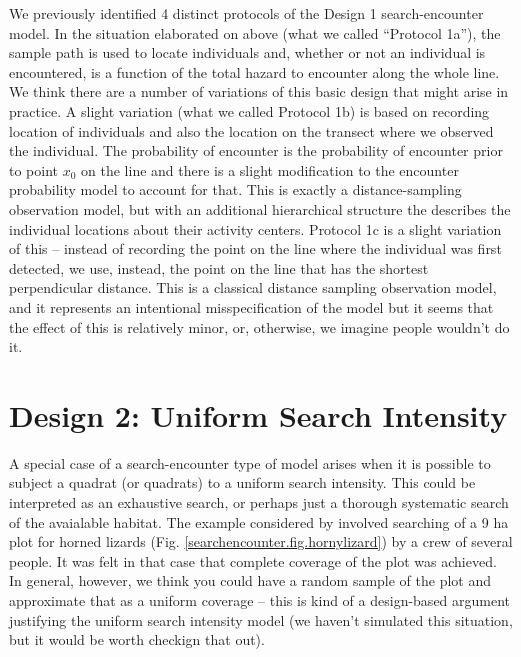 We previously identified 4 distinct protocols of the Design 1
search-encounter model.
In the situation elaborated on above (what we called ``Protocol 1a''), the sample path is used to
locate individuals and, whether or not an individual is encountered,
is a function of the total hazard to encounter along the whole line.
We think there are a number of variations of this basic design that
might arise in practice.
A slight variation (what we called Protocol 1b) is based on 
recording location of individuals and also the location on the transect
where we observed the individual.  The probability of encounter is the
probability of encounter prior to point $x_{0}$ on the line
\citep{skaug_schweder:1999} and there is a slight modification to the
encounter probability model to account for that. This is exactly a
distance-sampling observation model, but with an additional
hierarchical structure the describes the individual locations about
their activity centers.  Protocol 1c is a slight variation of this --
instead of recording the point on the line where the individual was
first detected, we use, instead, the point on the line that has the
shortest perpendicular distance. This is a classical distance sampling
observation model, and it represents an intentional misspecification
of the model but it seems that the effect of this is relatively minor,
or, otherwise, we imagine people wouldn't do it.

\section{Design 2: Uniform Search Intensity}

A special case of a search-encounter type of model arises when it is
possible to subject a quadrat (or quadrats) to a uniform search
intensity. This could be interpreted as an exhaustive search, or
perhaps just a thorough systematic search of the avaialable habitat.
The example considered by \citet{royle_young:2008} involved searching
of a 9 ha plot for horned lizards (Fig.
\ref{searchencounter.fig.hornylizard}) by a crew of several people. It
was felt in that case that complete coverage of the plot was
achieved. In general, however, we think you could have a random sample
of the plot and approximate that as a uniform coverage -- this is kind
of a design-based argument justifying the uniform search intensity
model (we haven't simulated this situation, but it would be worth
checkign that out).

